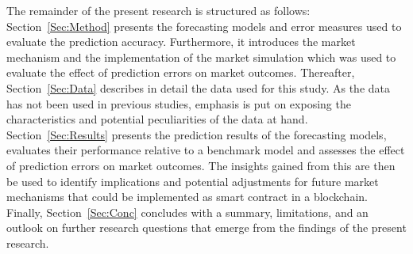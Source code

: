 The remainder of the present research is structured as follows: Section~\ref{Sec:Method} presents the forecasting models and error measures used to evaluate the prediction accuracy. Furthermore, it introduces the market mechanism and the implementation of the market simulation which was used to evaluate the effect of prediction errors on market outcomes. Thereafter, Section~\ref{Sec:Data} describes in detail the data used for this study. As the data has not been used in previous studies, emphasis is put on exposing the characteristics and potential peculiarities of the data at hand. Section~\ref{Sec:Results} presents the prediction results of the forecasting models, evaluates their performance relative to a benchmark model and assesses the effect of prediction errors on market outcomes. The insights gained from this are then be used to identify implications and potential adjustments for future market mechanisms that could be implemented as smart contract in a blockchain. Finally, Section~\ref{Sec:Conc} concludes with a summary, limitations, and an outlook on further research questions that emerge from the findings of the present research.

